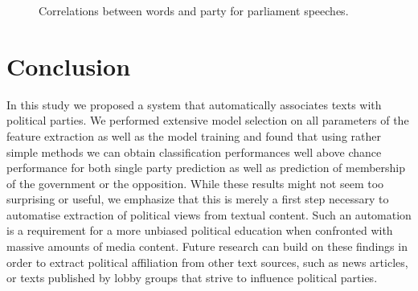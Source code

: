 \documentclass{article} %
\begin{document}
\begin{figure}
\begin{center}
%
\end{center}
\caption{
\label{fig:party_word_correlations}
Correlations between words and party for parliament speeches. }
\end{figure}

\section{Conclusion}
In this study we proposed a system that automatically associates texts with political parties. We performed extensive model selection on all parameters of the feature extraction as well as the model training and found that using rather simple methods we can obtain classification performances well above chance performance for both single party prediction as well as prediction of membership of the government or the opposition. While these results might not seem too surprising or useful, we emphasize that this is merely a first step necessary to automatise extraction of political views from textual content. Such an automation is a requirement for a more unbiased political education when confronted with massive amounts of media content. Future research can build on these findings in order to extract political affiliation from other text sources, such as news articles, or texts published by lobby groups that strive to influence political parties. 

\small{

 
}
\end{document}
